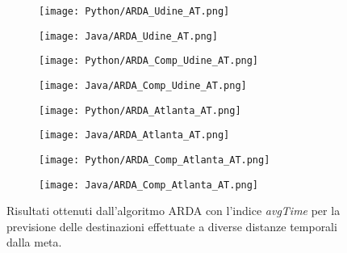 \begin{figure}[!ht]
    \begin{center}
    \begin{subfigure}[a.1]{0.45\textwidth}
        \texttt{[image: Python/ARDA\_Udine\_AT.png]} \caption{}
    \end{subfigure}
    \begin{subfigure}[a.2]{0.45\textwidth}
        \texttt{[image: Java/ARDA\_Udine\_AT.png]} \caption{}
    \end{subfigure}
    \begin{subfigure}[b.1]{0.45\textwidth}
        \texttt{[image: Python/ARDA\_Comp\_Udine\_AT.png]} \caption{}
    \end{subfigure}
    \begin{subfigure}[b.2]{0.45\textwidth}
        \texttt{[image: Java/ARDA\_Comp\_Udine\_AT.png]} \caption{}
    \end{subfigure}
    \begin{subfigure}[c.1]{0.45\textwidth}
        \texttt{[image: Python/ARDA\_Atlanta\_AT.png]} \caption{}
    \end{subfigure}
    \vspace{0.5cm}
    \begin{subfigure}[c.2]{0.45\textwidth}
        \texttt{[image: Java/ARDA\_Atlanta\_AT.png]} \caption{}
    \end{subfigure}
    \begin{subfigure}[d.1]{0.45\textwidth}
        \texttt{[image: Python/ARDA\_Comp\_Atlanta\_AT.png]} \caption{}
    \end{subfigure}
    \begin{subfigure}[d.2]{0.45\textwidth}
        \texttt{[image: Java/ARDA\_Comp\_Atlanta\_AT.png]} \caption{}
    \end{subfigure}
    \caption[ARDA_1_AT]{
    Risultati ottenuti dall'algoritmo ARDA con l'indice \textit{avgTime} per la
    previsione delle destinazioni effettuate a diverse distanze temporali dalla meta.
    }
    \label{etichetta}
    \end{center}
\end{figure}


